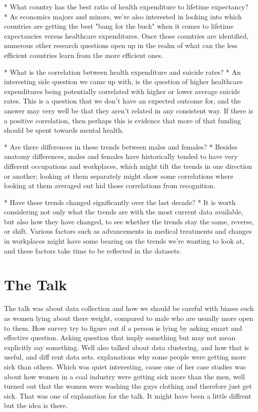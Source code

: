 \documentclass[11pt]{article}
\begin{document}
\begin{enemerate}
\begin{itemize}
* What country has the best ratio of health expenditure to lifetime expectancy?
  * As economics majors and minors, we're also interested in looking into which
    countries are getting the best "bang for the buck" when it comes to lifetime
    expectancies versus healthcare expenditures.  Once those countries are
    identified, numerous other research questions open up in the realm of what
    can the less efficient countries learn from the more efficient ones.

* What is the correlation between health expenditure and suicide rates?
  * An interesting side question we came up with, is the question of higher
    healthcare expenditures being potentially correlated with higher or lower
    average suicide rates.  This is a question that we don't have an expected
    outcome for, and the answer may very well be that they aren't related in any
    consistent way.  If there is a positive correlation, then perhaps this is
    evidence that more of that funding should be spent towards mental health.

* Are there differences in these trends between males and females?
  * Besides anatomy differences, males and females have historically tended to
    have very different occupations and workplaces, which might tilt the trends
    in one direction or another; looking at them separately might show some
    correlations where looking at them averaged out hid those correlations from
    recognition.

* Have these trends changed significantly over the last decade?
  * It is worth considering not only what the trends are with the most current
    data available, but also how they have changed, to see whether the trends
    stay the same, reverse, or shift.  Various factors such as advancements in
    medical treatments and changes in workplaces might have some bearing on the
    trends we're wanting to look at, and these factors take time to be reflected
    in the datasets.


\end{itemize}


\section{The Talk}
The talk was about data collection and how we should be careful with biases such as women lying about there weight, compared to male who are usually more open to them. How survey try to figure out if a person is lying by asking smart and effective question. Asking question that imply something but may not mean explicitly say something. Well also talked about data clustering, and how that is useful, and diff rent data sets. explanations why some people were getting more sick than others. Which was quiet interesting, cause one of her case studies was about how women in a coal industry were getting sick more than the men, well turned out that the women were washing the guys clothing and therefore just  get sick. That was one of explanation for the talk. It might have been a little diffrent but the idea is there. 

\end{enemerate}
\end{document}
